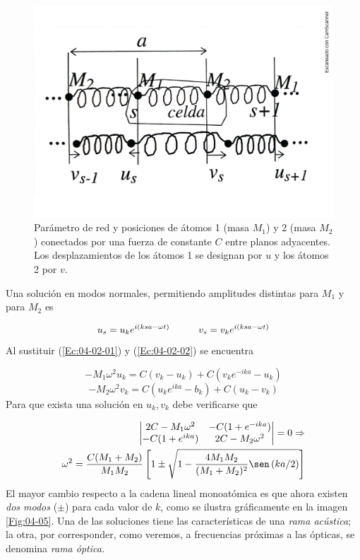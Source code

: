 \begin{figure}[h!] \centering
    \includegraphics[scale=0.4]{Cuerpo/Ch_04/Fotos libro 4.pdf}
    \caption{Parámetro de red y posiciones de átomos 1 (masa $M_1$) y 2 (masa $M_2$) conectados por una fuerza de constante $C$ entre planos adyacentes. Los desplazamientos de los átomos 1 se designan por $u$ y los átomos 2 por $v$.}
    \label{Fig:04-04}
\end{figure}    

Una solución en modos normales, permitiendo amplitudes distintas para $M_1$ y para $M_2$ es 

\begin{equation}
	u_s = u_k e^{i(ksa-\omega  t)} \quad \quad \quad v_s = v_k e^{i(ksa-\omega t)} \label{Ec:04-02-02}
\end{equation}
Al sustituir (\ref{Ec:04-02-01}) y (\ref{Ec:04-02-02}) se encuentra 

\begin{equation}
    -M_1 \omega^2 u_k = C(v_k - u_k) + C(v_k e^{-ika}-u_k)
\end{equation}
\begin{equation*}
    -M_2 \omega^2 v_k = C(u_k e^{ika} - b_k) + C(u_k - v_k)    
\end{equation*}
Para que exista una solución en $u_k,v_k$ debe verificarse que

\begin{eqnarray}
    \begin{vmatrix}
        2C - M_1\omega^2 & -C(1+e^{-ika})\\
        -C (1+e^{ika}) & 2C - M_2 \omega^2  
    \end{vmatrix}= 0 \Rightarrow \\
    \omega^2 = \frac{C(M_1+M_2)}{M_1M_2} \ccorchetes{1 \pm \sqrt{1-\frac{4M_1M_2}{(M_1+M_2)^2} \sen \parentesis{  ka/2}}}
\end{eqnarray}
El mayor cambio respecto a la cadena lineal monoatómica es que ahora existen \textit{dos modos} ($\pm$) para cada valor de $k$, como se ilustra gráficamente en la imagen \ref{Fig:04-05}. Una de las soluciones tiene las características de una \textit{rama acústica}; la otra, por corresponder, como veremos, a frecuencias próximas a las ópticas, se denomina \textit{rama óptica.}


